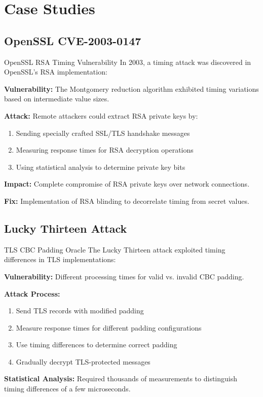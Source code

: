 \documentclass[12pt,a4paper]{article}
\theoremstyle{definition}
\begin{document}
\section{Case Studies}

\subsection{OpenSSL CVE-2003-0147}

\begin{examplebox}{OpenSSL RSA Timing Vulnerability}
In 2003, a timing attack was discovered in OpenSSL's RSA implementation:

\textbf{Vulnerability:} The Montgomery reduction algorithm exhibited timing variations based on intermediate value sizes.

\textbf{Attack:} Remote attackers could extract RSA private keys by:
\begin{enumerate}
    \item Sending specially crafted SSL/TLS handshake messages
    \item Measuring response times for RSA decryption operations
    \item Using statistical analysis to determine private key bits
\end{enumerate}

\textbf{Impact:} Complete compromise of RSA private keys over network connections.

\textbf{Fix:} Implementation of RSA blinding to decorrelate timing from secret values.
\end{examplebox}

\subsection{Lucky Thirteen Attack}

\begin{examplebox}{TLS CBC Padding Oracle}
The Lucky Thirteen attack exploited timing differences in TLS implementations:

\textbf{Vulnerability:} Different processing times for valid vs. invalid CBC padding.

\textbf{Attack Process:}
\begin{enumerate}
    \item Send TLS records with modified padding
    \item Measure response times for different padding configurations
    \item Use timing differences to determine correct padding
    \item Gradually decrypt TLS-protected messages
\end{enumerate}

\textbf{Statistical Analysis:} Required thousands of measurements to distinguish timing differences of a few microseconds.
\end{examplebox}
\end{document}
